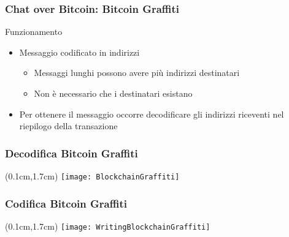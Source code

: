 \begin{frame}
 \frametitle{Chat over Bitcoin: Bitcoin Graffiti}
 
 Funzionamento
 \begin{itemize}
  \item<1-> Messaggio codificato in indirizzi
  \begin{itemize}
   \item Messaggi lunghi possono avere più indirizzi destinatari
   \item Non è necessario che i destinatari esistano
  \end{itemize}
  \item<2-> Per ottenere il messaggio occorre decodificare gli indirizzi 
riceventi nel riepilogo della transazione

 \end{itemize}

\end{frame}

\begin{frame}
 \frametitle{Decodifica Bitcoin Graffiti}

 \begin{textblock*}{5cm}(0.1cm,1.7cm)
  \texttt{[image: BlockchainGraffiti]}
 \end{textblock*}

\end{frame}


\begin{frame}
 \frametitle{Codifica Bitcoin Graffiti}

 \begin{textblock*}{5cm}(0.1cm,1.7cm)
  \texttt{[image: WritingBlockchainGraffiti]}
 \end{textblock*}

\end{frame}
